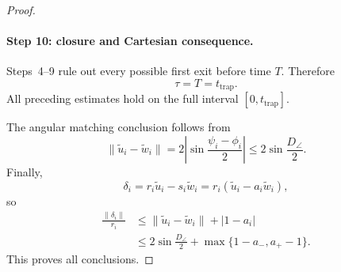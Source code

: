 \documentclass{article} %
\theoremstyle{plain}
\theoremstyle{definition}
\theoremstyle{remark}
\begin{document}
\begin{proof}
\paragraph{Step 10: closure and Cartesian consequence.}

Steps~4--9 rule out every possible first exit before time $T$.  Therefore
\[
\tau=T=t_{\mathrm{trap}}.
\]
All preceding estimates hold on the full interval
$[0,t_{\mathrm{trap}}]$.

The angular matching conclusion follows from
\[
\|\widetilde u_i-\widetilde w_i\|
=
2\left|
\sin\frac{\psi_i-\phi_i}{2}
\right|
\le
2\sin\frac{D_\angle}{2}.
\]
Finally,
\[
\delta_i
=
r_i\widetilde u_i-s_i\widetilde w_i
=
r_i
\left(
\widetilde u_i-a_i\widetilde w_i
\right),
\]
so
\[
\begin{aligned}
\frac{\|\delta_i\|}{r_i}
&\le
\|\widetilde u_i-\widetilde w_i\|
+
|1-a_i|
\\
&\le
2\sin\frac{D_\angle}{2}
+
\max\{1-a_-,a_+-1\}.
\end{aligned}
\]
This proves all conclusions.
\end{proof}
\end{document}
